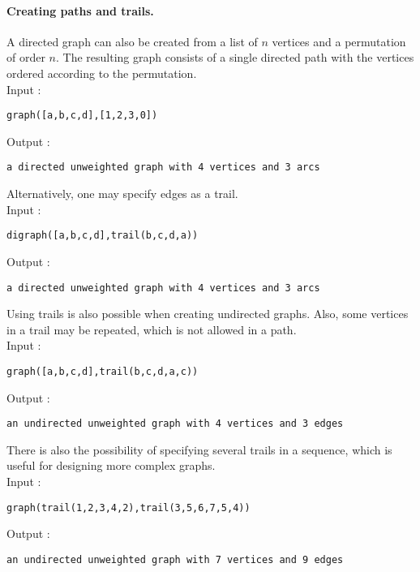 \documentclass[a4paper,11pt]{article}
\begin{document}
\paragraph{Creating paths and trails.}
A directed graph can also be created from a list of $ n $ vertices and a permutation of order $ n $. The resulting graph consists of a single directed path with the vertices ordered according to the permutation.\\
Input :
\begin{center}
  \tt graph([a,b,c,d],[1,2,3,0])
\end{center}
Output :
\begin{center}
  \tt a directed unweighted graph with 4 vertices and 3 arcs
\end{center}
Alternatively, one may specify edges as a trail.\\
Input :
\begin{center}
  \tt digraph([a,b,c,d],trail(b,c,d,a))
\end{center}
Output :
\begin{center}
  \tt a directed unweighted graph with 4 vertices and 3 arcs
\end{center}
Using trails is also possible when creating undirected graphs. Also, some vertices in a trail may be repeated, which is not allowed in a path.\\
Input :
\begin{center}
  \tt graph([a,b,c,d],trail(b,c,d,a,c))
\end{center}
Output :
\begin{center}
  \tt an undirected unweighted graph with 4 vertices and 3 edges
\end{center}
There is also the possibility of specifying several trails in a sequence, which is useful for designing more complex graphs.\\
Input :
\begin{center}
  \tt graph(trail(1,2,3,4,2),trail(3,5,6,7,5,4))
\end{center}
Output :
\begin{center}
  \tt an undirected unweighted graph with 7 vertices and 9 edges
\end{center}
\end{document}
